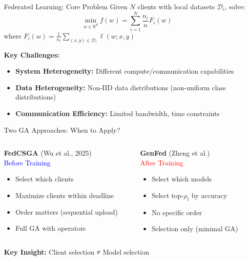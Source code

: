 \documentclass{beamer}
\begin{document}
\begin{frame}{Federated Learning: Core Problem}
Given $N$ clients with local datasets $\mathcal{D}_i$, solve:
\begin{equation}
\min_{w \in \mathbb{R}^d} f(w) = \sum_{i=1}^{N} \frac{n_i}{n} F_i(w)
\end{equation}
where $F_i(w) = \frac{1}{n_i}\sum_{(x,y) \in \mathcal{D}_i} \ell(w; x, y)$

\vspace{0.3cm}
\textbf{Key Challenges:}
\begin{itemize}
\item \textbf{System Heterogeneity:} Different compute/communication capabilities
\item \textbf{Data Heterogeneity:} Non-IID data distributions (non-uniform class distributions)
\item \textbf{Communication Efficiency:} Limited bandwidth, time constraints
\end{itemize}
\end{frame}

\begin{frame}{Two GA Approaches: When to Apply?}
\begin{columns}[T]
\begin{column}{0.48\textwidth}
\textbf{FedCSGA} (Wu et al., 2025)\\
\textcolor{blue}{Before Training}
\begin{itemize}
\item Select which clients
\item Maximize clients within deadline
\item Order matters (sequential upload)
\item Full GA with operators
\end{itemize}
\end{column}

\begin{column}{0.48\textwidth}
\textbf{GenFed} (Zheng et al.)\\
\textcolor{red}{After Training}
\begin{itemize}
\item Select which models
\item Select top-$\rho_t$ by accuracy  
\item No specific order
\item Selection only (minimal GA)
\end{itemize}
\end{column}
\end{columns}

\vspace{0.4cm}
\textbf{Key Insight:} Client selection ≠ Model selection
\end{frame}
\end{document}
